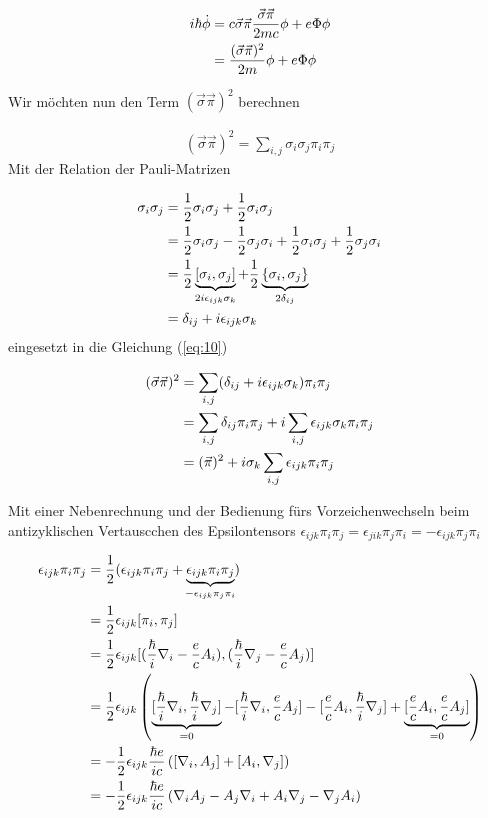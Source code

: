 \begin{align}
  \label{eq:8}
   i\hbar\dot\phi &= c\vec\sigma\vec\pi \frac{\vec\sigma\vec\pi}{2mc}\phi  + e\Phi\phi  \notag \\
 &= \frac{(\vec\sigma\vec\pi)^2}{2m}\phi  + e\Phi\phi
\end{align}

Wir möchten nun den Term \((\vec\sigma\vec\pi)^2\) berechnen

\begin{align}
  \label{eq:10}
  (\vec\sigma\vec\pi)^2 = \sum_{i,j}\sigma_i\sigma_j\pi_i\pi_j
\end{align}
Mit der Relation der Pauli-Matrizen

\begin{align}
  \label{eq:11}
  \sigma_i\sigma_j &= \frac{1}{2}\sigma_i\sigma_j + \frac{1}{2}\sigma_i\sigma_j \notag\\
 &= \frac{1}{2}\sigma_i\sigma_j - \frac{1}{2}\sigma_j\sigma_i  + \frac{1}{2}\sigma_i\sigma_j + \frac{1}{2}\sigma_j\sigma_i  \notag\\
&= \frac{1}{2}\underbr{[\sigma_i,\sigma_j]}_{2i\epsilon_{ijk}\sigma_k} + \frac{1}{2}\underbr{\{\sigma_i,\sigma_j\}}_{2\delta_{ij}} \notag\\
&= \delta_{ij} + i\epsilon_{ijk}\sigma_k 
\end{align}
eingesetzt in die Gleichung (\ref{eq:10})

\begin{align}
  \label{eq:12}
  (\vec\sigma\vec\pi)^2 &= \sum_{i,j}(\delta_{ij} + i\epsilon_{ijk}\sigma_k )\pi_i\pi_j \notag\\
 &= \sum_{i,j}\delta_{ij}\pi_i\pi_j + i \sum_{i,j}\epsilon_{ijk}\sigma_k \pi_i\pi_j \notag\\
&= (\vec\pi)^2 + i\sigma_k \sum_{i,j}\epsilon_{ijk} \pi_i\pi_j 
\end{align}

Mit einer Nebenrechnung und der Bedienung fürs Vorzeichenwechseln beim antizyklischen Vertauscchen des Epsilontensors \( \epsilon_{ijk} \pi_i\pi_j = \epsilon_{jik} \pi_j\pi_i= - \epsilon_{ijk} \pi_j\pi_i  \) 

\begin{align}
  \label{eq:13}
  \epsilon_{ijk}\pi_i\pi_j  &= \frac{1}{2}(  \epsilon_{ijk}\pi_i\pi_j + \underbr{ \epsilon_{ijk} \pi_i\pi_j}_{-\epsilon_{ijk} \pi_j\pi_i} )\notag\\
&= \frac{1}{2} \epsilon_{ijk}[\pi_i,\pi_j] \notag\\
&= \frac{1}{2} \epsilon_{ijk}[(\frac{\hbar}{i}\nabla_i-\frac{e}{c}A_i),(\frac{\hbar}{i}\nabla_j-\frac{e}{c}A_j) ] \notag\\
&= \frac{1}{2} \epsilon_{ijk}\left(\underbr{[\frac{\hbar}{i}\nabla_i,\frac{\hbar}{i}\nabla_j]}_{=0}-[\frac{\hbar}{i}\nabla_i, \frac{e}{c}A_j]- [\frac{e}{c}A_i,\frac{\hbar}{i}\nabla_j]+ \underbr{[\frac{e}{c}A_i,\frac{e}{c}A_j]}_{=0}\right) \notag\\
&= -\frac{1}{2} \epsilon_{ijk}\frac{\hbar e}{ic} \left( [\nabla_i, A_j] + [A_i,\nabla_j]\right) \notag\\
&= -\frac{1}{2} \epsilon_{ijk}\frac{\hbar e}{ic} \left( \nabla_i A_j-A_j\nabla_i + A_i\nabla_j-\nabla_jA_i\right)
\end{align}

